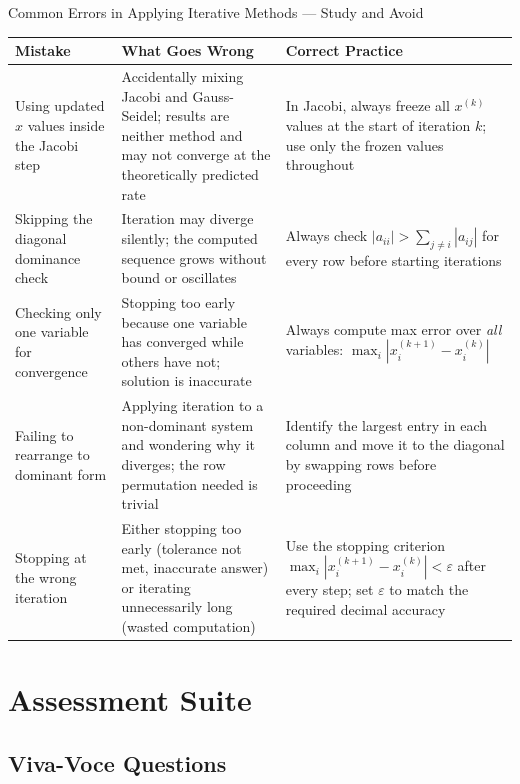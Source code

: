 \documentclass[12pt,a4paper]{article}
\begin{document}
\begin{mistakebox}{Common Errors in Applying Iterative Methods --- Study and Avoid}
\begin{tabular}{@{}p{4cm}p{5cm}p{4.5cm}@{}}
\toprule
\textbf{Mistake} & \textbf{What Goes Wrong} & \textbf{Correct Practice} \\
\midrule
Using updated \(x\) values inside the Jacobi step &
  Accidentally mixing Jacobi and Gauss-Seidel; results are neither method
  and may not converge at the theoretically predicted rate &
  In Jacobi, always freeze all \(x^{(k)}\) values at the start of iteration \(k\);
  use only the frozen values throughout \\
\addlinespace
Skipping the diagonal dominance check &
  Iteration may diverge silently; the computed sequence grows without bound
  or oscillates &
  Always check \(|a_{ii}| > \sum_{j\neq i}|a_{ij}|\) for every row
  before starting iterations \\
\addlinespace
Checking only one variable for convergence &
  Stopping too early because one variable has converged while others have not;
  solution is inaccurate &
  Always compute max error over \emph{all} variables:
  \(\max_i|x_i^{(k+1)}-x_i^{(k)}|\) \\
\addlinespace
Failing to rearrange to dominant form &
  Applying iteration to a non-dominant system and wondering why it diverges;
  the row permutation needed is trivial &
  Identify the largest entry in each column and move it to the diagonal
  by swapping rows before proceeding \\
\addlinespace
Stopping at the wrong iteration &
  Either stopping too early (tolerance not met, inaccurate answer) or
  iterating unnecessarily long (wasted computation) &
  Use the stopping criterion \(\max_i|x_i^{(k+1)}-x_i^{(k)}| < \varepsilon\)
  after every step; set \(\varepsilon\) to match the required decimal accuracy \\
\bottomrule
\end{tabular}
\end{mistakebox}

\section{Assessment Suite}

\subsection*{Viva-Voce Questions}
\end{document}
